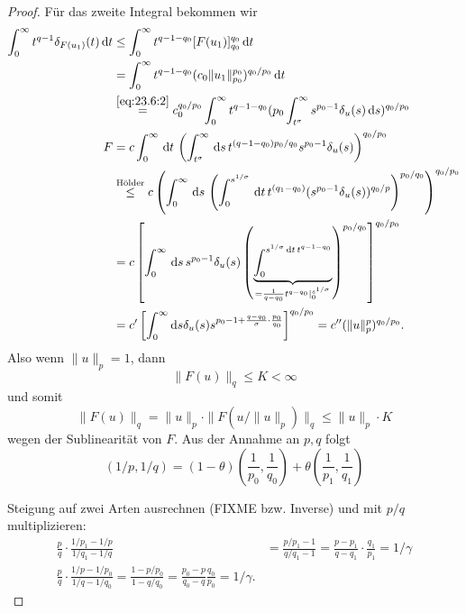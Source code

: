 \documentclass[
paper=a4,
bibtotocnumbered,
liststotocnumbered,
tablecaptionabove,
pointlessnumbers,
twoside,
openright,
10pt
]
{report}
\theoremstyle{definition}
\numberwithin{equation}{chapter}
\begin{document}
\begin{proof}
Für das zweite Integral bekommen wir
\begin{align}
\int_0^\infty t^{q-1} \delta_{F(u_1)}(t) \, \mathrm dt &\le \int_0^\infty t^{q-1-q_0} [F(u_1)]_{q_0}^{q_0} \, \mathrm dt\\
&= \int_0^\infty t^{q-1-q_0} (c_0 \| u_1\|_{p_0}^{p_0} )^{q_0/p_0}\, \mathrm dt\\
&\stackrel{\eqref{eq:23.6:2}}= c_0^{q_0/p_0} \int_0^\infty t^{q-1-q_0} ( p_0 \int_{t^\sigma}^\infty s^{p_0-1} \delta_u(s) \, \mathrm ds ) ^{q_0/p_0}\\
F&= c \int_0^\infty \, \mathrm dt \, \left ( \int_{t^\sigma}^\infty \, \mathrm ds\, t^{(q-1-q_0)p_0/q_0} s^{p_0-1} \delta_u(s)  \right )^{q_0/p_0}\\
&\stackrel{\text{Hölder}}\le c \left (\int_0^\infty \, \mathrm ds\,\left ( \int_0^{s^{1/\sigma}} \, \mathrm dt \, t^{(q_1-q_0)} (s^{p_0-1} \delta_u(s))^{q_0/p} \right )^{p_0/q_0} \right )^{q_0/p_0}\\
&= c \left [ \int_0^\infty \, \mathrm ds \, s^{p_0-1} \delta_u(s) \left ( \underbrace{\int_0^{s^{1/\sigma} \, \mathrm dt \, t^{q-1-q_0}}}_{=\frac{1}{q-q_0} t^{q-q_0} |_0^{s^{1/\sigma}}} \right )^{p_0/q_0} \right ]^{q_0/p_0}\\
&= c' \left [ \int_0^\infty \mathrm ds \delta_u(s) s^{p_0-1+\frac{q-q_0}{\sigma} \cdot \frac{p_0}{q_0}} \right ]^{q_0/p_0} = c'' ( \| u\|_p^p)^{q_0/p_0}.
\end{align}
Also wenn $\| u\|_p=1$, dann
\begin{equation}
\| F(u)\|_q \le K < \infty
\end{equation}
und somit
\begin{equation}
\| F(u)\|_q = \|u\|_p \cdot \| F(u/\|u\|_p) \|_q \le \|u\|_p \cdot K
\end{equation}
wegen der Sublinearität von $F$.  Aus der Annahme an $p,q$ folgt
\begin{equation}
(1/p, 1/q)= (1-\theta) \left (\frac{1}{p_0}, \frac{1}{q_0} \right ) + \theta \left ( \frac{1}{p_1} , \frac{1}{q_1} \right )
\end{equation}

Steigung auf zwei Arten ausrechnen (FIXME bzw. Inverse) und mit $p/q$ multiplizieren:
\begin{align}
\frac{p}{q} \cdot \frac{1/p_1 - 1/p}{1/q_1- 1/q} &= \frac{p/p_1 -1}{q/q_1 -1} = \frac{p-p_1}{q-q_1} \cdot \frac{q_1}{p_1}=1/\gamma\\
\frac{p}{q} \cdot \frac{1/p-1/p_0}{1/q - 1/q_0} =  \frac{1- p/p_0}{1-q/q_0} = \frac{p_0 -p}{q_0-q} \frac{q_0}{p_0}=1/\gamma.
\end{align}


\end{proof}
\end{document}
